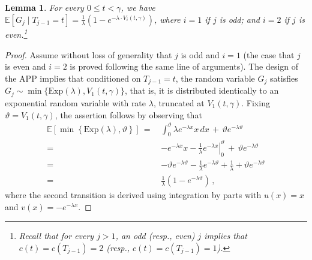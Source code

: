 \documentclass[11pt]{article}
\def\LongVersion{}
\def\LongVersionEnd{}
\newtheorem{lemma}[theorem]{Lemma}
\theoremstyle{definition}
\theoremstyle{plain}
\newtheorem{lemma}[theorem]{Lemma}
\theoremstyle{definition}
\theoremstyle{plain}
\newtheorem{lemma}{Lemma}[section]
\theoremstyle{definition}
\theoremstyle{plain}
\newcommand{\Expect}{\mathbb{E}}
\newcommand{\ExpDist}{\mathrm{Exp}}
\begin{document}
\begin{lemma} \label{lemma:APP-low-bound-last-digestion}
For every $0 \leq t < \gamma$, we have
$\Expect[G_{j} \mid T_{j - 1} = t]
=
\frac{1}{\lambda} \left( 1 - e^{-\lambda \cdot V_{i}(t, \gamma)} \right)$,
where
$i = 1$
if $j$ is odd;
and
$i = 2$
if $j$ is even.\footnote{%
Recall that for every
$j > 1$,
an odd (resp., even) $j$ implies that
$c(t) = c(T_{j - 1})= 2$
(resp.,
$c(t) = c(T_{j - 1}) = 1$).
}
\end{lemma}
%
\LongVersion %
\begin{proof}
Assume without loss of generality that $j$ is odd and $i = 1$ (the case that
$j$ is even and $i = 2$ is proved following the same line of arguments).
The design of the APP implies that conditioned on
$T_{j - 1} = t$,
the random variable $G_{j}$ satisfies
$G_{j} \sim \min \{ \ExpDist(\lambda), V_{1}(t, \gamma) \}$,
that is, it is distributed identically to an exponential random variable with
rate $\lambda$, truncated at $V_{1}(t, \gamma)$.
Fixing
$\vartheta = V_{1}(t, \gamma)$,
the assertion follows by observing that
\begin{align*}
\Expect \left[ \min \left\{ \ExpDist(\lambda), \vartheta \right\}
\right]
\, = \, &
\int_{0}^{\vartheta} \lambda e^{-\lambda x} x \, d x \, + \, \vartheta e^{-\lambda
\vartheta} \\
= \, &
\left.
-e^{-\lambda x} x - \frac{1}{\lambda} e^{-\lambda x}
\right|_{0}^{\vartheta}
\, + \, \vartheta e^{-\lambda \vartheta} \\
= \, &
- \vartheta e^{-\lambda \vartheta}
- \frac{1}{\lambda} e^{-\lambda \vartheta}
+ \frac{1}{\lambda}
+ \vartheta e^{-\lambda \vartheta} \\
= \, &
\frac{1}{\lambda} \left( 1 - e^{-\lambda \vartheta} \right) \, ,
\end{align*}
where the second transition is derived using integration by parts with
$u(x) = x$
and
$v(x) = -e^{-\lambda x}$.
\end{proof}
\LongVersionEnd %
\end{document}
